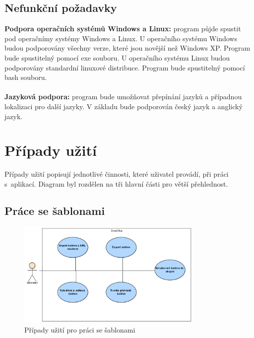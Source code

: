 \documentclass[thesis=B,czech]{resources/FITthesis}[2012/06/26]
\begin{document}
\subsection{Nefunkční požadavky}

\textbf{Podpora operačních systémů Windows a Linux:} program půjde spustit pod operačnímy systémy Windows a Linux. U operačního systému Windows budou podporovány všechny verze, které jsou novější než Windows XP. Program bude spustitelný pomocí exe souboru. U operačního systému Linux budou podporovány standardní linuxové distribuce. Program bude spustitelný pomocí bash souboru.\\
\\
\textbf{Jazyková podpora:} program bude umožňovat přepínání jazyků a případnou lokalizaci pro další jazyky. V základu bude podporován český jazyk a anglický jazyk.



	\section{Případy užití}
Případy užití popisují jednotlivé činnosti, které uživatel provádí, při práci s~aplikací. Diagram byl rozdělen na tři hlavní části pro větší přehlednost.
\subsection{Práce se šablonami}
\begin{figure}\centering
	\includegraphics[width=0.8\textwidth]{images/usecase_sablony.pdf}
	\caption[Případy užití pro šablony]{Případy užití pro práci se šablonami}\label{fig:uc_sablony}
\end{figure}
\end{document}
